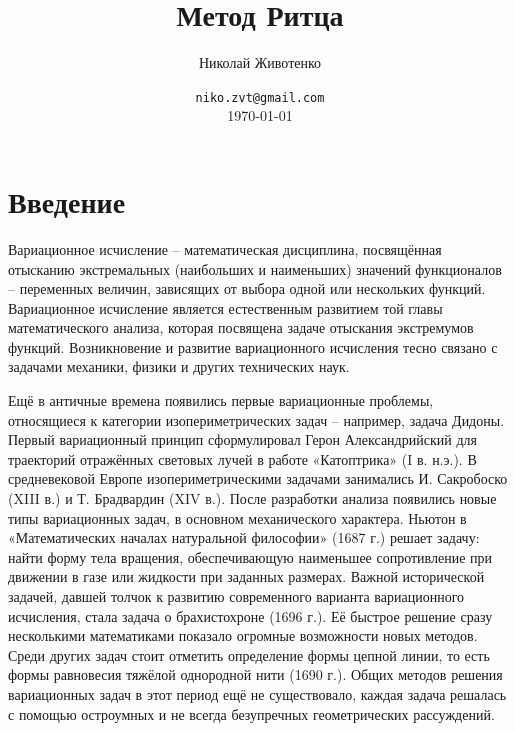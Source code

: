 \documentclass{article}
\title{Метод Ритца} %
\author[1]{Николай Животенко} %
\date{\texttt{niko.zvt@gmail.com} \\ \small \today } %
\affil[1]{\small M.Sc., каф. Ракетно-космических композитных конструкций, МГТУ им. Н. Э. Баумана}
\affil[1]{\small B.Sc., каф. Физики твёрдого тела, Воронежский Государственный Технический Университет}
\begin{document}
\maketitle %


\section*{Введение} %

\begin{info} %
	Вариационное исчисление -- математическая дисциплина, посвящённая отысканию экстремальных (наибольших и наименьших) значений функционалов -- переменных величин, зависящих от выбора одной или нескольких функций. Вариационное исчисление является естественным развитием той главы математического анализа, которая посвящена задаче отыскания экстремумов функций. Возникновение и развитие вариационного исчисления тесно связано с задачами механики, физики и других технических наук.
\end{info}

Ещё в античные времена появились первые вариационные проблемы, относящиеся к категории изопериметрических задач -- например, задача Дидоны. Первый вариационный принцип сформулировал Герон Александрийский для траекторий отражённых световых лучей в работе «Катоптрика» (I в. н.э.). В средневековой Европе изопериметрическими задачами занимались И. Сакробоско (XIII в.) и Т. Брадвардин (XIV в.). После разработки анализа появились новые типы вариационных задач, в основном механического характера. Ньютон в «Математических началах натуральной философии» (1687 г.) решает задачу: найти форму тела вращения, обеспечивающую наименьшее сопротивление при движении в газе или жидкости при заданных размерах. Важной исторической задачей, давшей толчок к развитию современного варианта вариационного исчисления, стала задача о брахистохроне (1696 г.). Её быстрое решение сразу несколькими математиками показало огромные возможности новых методов. Среди других задач стоит отметить определение формы цепной линии, то есть формы равновесия тяжёлой однородной нити (1690 г.). Общих методов решения вариационных задач в этот период ещё не существовало, каждая задача решалась с помощью остроумных и не всегда безупречных геометрических рассуждений.
\end{document}
